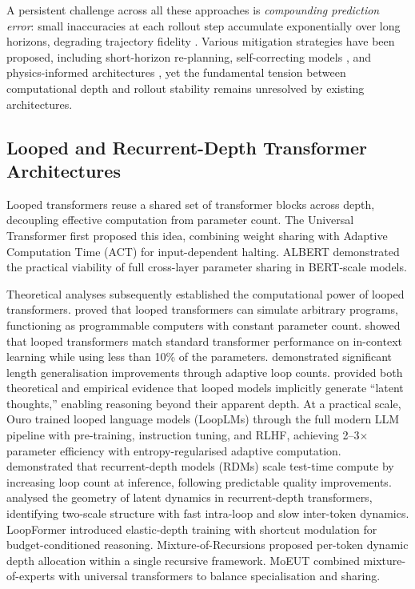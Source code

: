 A persistent challenge across all these approaches is \emph{compounding prediction error}: small inaccuracies at each rollout step accumulate exponentially over long horizons, degrading trajectory fidelity \citep{xiao2019compoundingerror, talvitie2017self, lambert2022survey}. Various mitigation strategies have been proposed, including short-horizon re-planning, self-correcting models \citep{talvitie2017self}, and physics-informed architectures \citep{pinwm2025, prophy2025}, yet the fundamental tension between computational depth and rollout stability remains unresolved by existing architectures.


\subsection{Looped and Recurrent-Depth Transformer Architectures}

Looped transformers reuse a shared set of transformer blocks across depth, decoupling effective computation from parameter count. The Universal Transformer \citep{dehghani2019universal} first proposed this idea, combining weight sharing with Adaptive Computation Time (ACT) \citep{graves2016act} for input-dependent halting. ALBERT \citep{lan2020albert} demonstrated the practical viability of full cross-layer parameter sharing in BERT-scale models.

Theoretical analyses subsequently established the computational power of looped transformers. \citet{giannou2023programmable} proved that looped transformers can simulate arbitrary programs, functioning as programmable computers with constant parameter count.  \citet{yang2023looped} showed that looped transformers match standard transformer performance on in-context learning while using less than 10\% of the parameters. \citet{fan2024lengthgen} demonstrated significant length generalisation improvements through adaptive loop counts. \citet{saunshi2025latentthoughts} provided both theoretical and empirical evidence that looped models implicitly generate ``latent thoughts,'' enabling reasoning beyond their apparent depth. At a practical scale, Ouro \citep{zhu2025ouro} trained looped language models (LoopLMs) through the full modern LLM pipeline with pre-training, instruction tuning, and RLHF, achieving 2--3$\times$ parameter efficiency with entropy-regularised adaptive computation. \citet{geiping2025rdm} demonstrated that recurrent-depth models (RDMs) scale test-time compute by increasing loop count at inference, following predictable quality improvements. \citet{pappone2025twoscale} analysed the geometry of latent dynamics in recurrent-depth transformers, identifying two-scale structure with fast intra-loop and slow inter-token dynamics. LoopFormer \citep{jeddi2025loopformer} introduced elastic-depth training with shortcut modulation for budget-conditioned reasoning. Mixture-of-Recursions \citep{bae2025mor} proposed per-token dynamic depth allocation within a single recursive framework. MoEUT \citep{csordas2024moeut} combined mixture-of-experts with universal transformers to balance specialisation and sharing.

